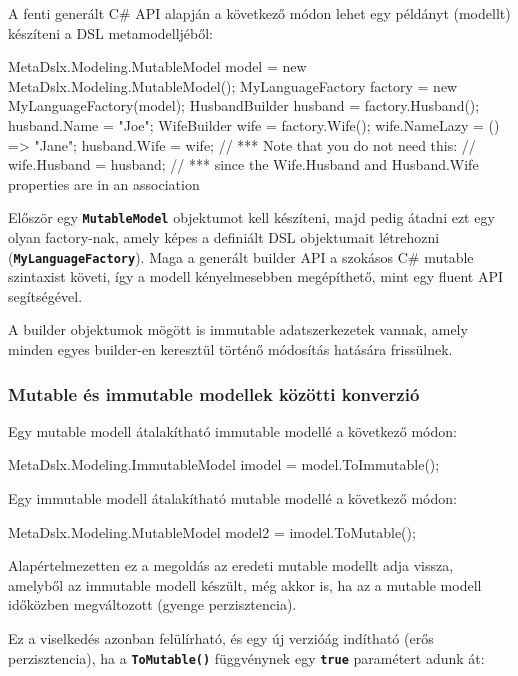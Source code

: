 \documentclass[12pt, a4paper]{report}
\newcommand{\ff}[1]{\textbf{\texttt{#1}}}
\begin{document}
A fenti generált C\# API alapján a következő módon lehet egy példányt (modellt) készíteni a DSL metamodelljéből:

\begin{csharpcode}
MetaDslx.Modeling.MutableModel model = new MetaDslx.Modeling.MutableModel();
MyLanguageFactory factory = new MyLanguageFactory(model);
HusbandBuilder husband = factory.Husband();
husband.Name = "Joe";
WifeBuilder wife = factory.Wife();
wife.NameLazy = () => "Jane";
husband.Wife = wife;
// *** Note that you do not need this:
// wife.Husband = husband; 
// *** since the Wife.Husband and Husband.Wife properties are in an association
\end{csharpcode}

Először egy \ff{MutableModel} objektumot kell készíteni, majd pedig átadni ezt egy olyan factory-nak, amely képes a definiált DSL objektumait létrehozni (\ff{MyLanguageFactory}). Maga a generált builder API a szokásos C\# mutable szintaxist követi, így a modell kényelmesebben megépíthető, mint egy fluent API segítségével.

A builder objektumok mögött is immutable adatszerkezetek vannak, amely minden egyes builder-en keresztül történő módosítás hatására frissülnek.

\subsubsection{Mutable és immutable modellek közötti konverzió}

Egy mutable modell átalakítható immutable modellé a következő módon:

\begin{csharpcode}
MetaDslx.Modeling.ImmutableModel imodel = model.ToImmutable();
\end{csharpcode}

Egy immutable modell átalakítható mutable modellé a következő módon:

\begin{csharpcode}
MetaDslx.Modeling.MutableModel model2 = imodel.ToMutable();
\end{csharpcode}

Alapértelmezetten ez a megoldás az eredeti mutable modellt adja vissza, amelyből az immutable modell készült, még akkor is, ha az a mutable modell időközben megváltozott (gyenge perzisztencia).

Ez a viselkedés azonban felülírható, és egy új verzióág indítható (erős perzisztencia), ha a \ff{ToMutable()} függvénynek egy \ff{true} paramétert adunk át:
\end{document}
